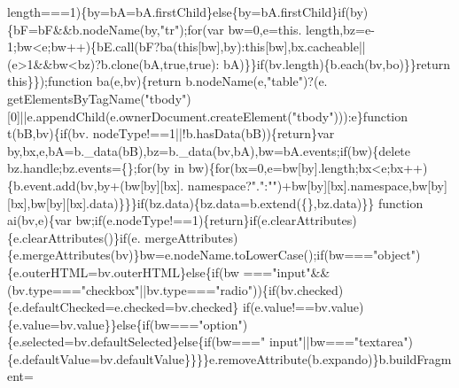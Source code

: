 \begin{DoxyCode}
      length===1)\{by=bA=bA.firstChild\}\textcolor{keywordflow}{else}\{by=bA.firstChild\}\textcolor{keywordflow}{if}(by)\{bF=bF&&b.nodeName(by,\textcolor{stringliteral}{"tr"});\textcolor{keywordflow}{for}(var bw=0,e=this.
      length,bz=e-1;bw<e;bw++)\{bE.call(bF?ba(\textcolor{keyword}{this}[bw],by):\textcolor{keyword}{this}[bw],bx.cacheable||(e>1&&bw<bz)?b.clone(bA,\textcolor{keyword}{true},\textcolor{keyword}{true}):
      bA)\}\}\textcolor{keywordflow}{if}(bv.length)\{b.each(bv,bo)\}\}\textcolor{keywordflow}{return} \textcolor{keyword}{this}\}\});\textcolor{keyword}{function} ba(e,bv)\{\textcolor{keywordflow}{return} b.nodeName(e,\textcolor{stringliteral}{"table"})?(e.
      getElementsByTagName(\textcolor{stringliteral}{"tbody"})[0]||e.appendChild(e.ownerDocument.createElement(\textcolor{stringliteral}{"tbody"}))):e\}\textcolor{keyword}{function} t(bB,bv)\{\textcolor{keywordflow}{if}(bv.
      nodeType!==1||!b.hasData(bB))\{\textcolor{keywordflow}{return}\}var by,bx,e,bA=b.\_data(bB),bz=b.\_data(bv,bA),bw=bA.events;\textcolor{keywordflow}{if}(bw)\{\textcolor{keyword}{delete} 
      bz.handle;bz.events=\{\};\textcolor{keywordflow}{for}(by in bw)\{\textcolor{keywordflow}{for}(bx=0,e=bw[by].length;bx<e;bx++)\{b.event.add(bv,by+(bw[by][bx].\textcolor{keyword}{
      namespace}?\textcolor{stringliteral}{"."}:\textcolor{stringliteral}{""})+bw[by][bx].\textcolor{keyword}{namespace},bw[by][bx],bw[by][bx].data)\}\}\}\textcolor{keywordflow}{if}(bz.data)\{bz.data=b.extend(\{\},bz.data)\}\}\textcolor{keyword}{
      function} ai(bv,e)\{var bw;\textcolor{keywordflow}{if}(e.nodeType!==1)\{\textcolor{keywordflow}{return}\}\textcolor{keywordflow}{if}(e.clearAttributes)\{e.clearAttributes()\}\textcolor{keywordflow}{if}(e.
      mergeAttributes)\{e.mergeAttributes(bv)\}bw=e.nodeName.toLowerCase();\textcolor{keywordflow}{if}(bw===\textcolor{stringliteral}{"object"})\{e.outerHTML=bv.outerHTML\}\textcolor{keywordflow}{else}\{\textcolor{keywordflow}{if}(bw
      ===\textcolor{stringliteral}{"input"}&&(bv.type===\textcolor{stringliteral}{"checkbox"}||bv.type===\textcolor{stringliteral}{"radio"}))\{\textcolor{keywordflow}{if}(bv.checked)\{e.defaultChecked=e.checked=bv.checked\}\textcolor{keywordflow}{
      if}(e.value!==bv.value)\{e.value=bv.value\}\}\textcolor{keywordflow}{else}\{\textcolor{keywordflow}{if}(bw===\textcolor{stringliteral}{"option"})\{e.selected=bv.defaultSelected\}\textcolor{keywordflow}{else}\{\textcolor{keywordflow}{if}(bw===\textcolor{stringliteral}{"
      input"}||bw===\textcolor{stringliteral}{"textarea"})\{e.defaultValue=bv.defaultValue\}\}\}\}e.removeAttribute(b.expando)\}b.buildFragment=\textcolor{keyword}{
}
\end{DoxyCode}
